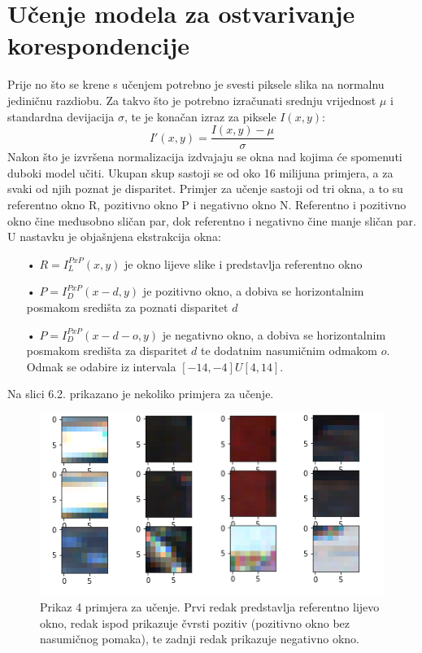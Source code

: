 \documentclass[times, utf8, zavrsni, numeric]{fer}
\begin{document}
\section{Učenje modela za ostvarivanje korespondencije}
Prije no što se krene s učenjem potrebno je svesti piksele slika na normalnu jediničnu razdiobu. Za takvo što je potrebno izračunati srednju vrijednost $\mu$ i standardna devijacija $\sigma$, te je konačan izraz za piksele $I(x,y)$:
\begin{equation}
I'(x,y)= \frac{I(x,y) - \mu}{\sigma}
\label{eq:normalizacija}
\end{equation}
Nakon što je izvršena normalizacija izdvajaju se okna nad kojima će spomenuti duboki model učiti.
Ukupan skup sastoji se od oko 16 milijuna primjera, a za svaki od njih poznat je disparitet.
Primjer za učenje sastoji od tri okna, a to su referentno okno R, pozitivno okno P i negativno okno N. Referentno i pozitivno okno čine međusobno sličan par, dok referentno i negativno čine manje sličan par. U nastavku je objašnjena ekstrakcija okna:
\begin{itemize}
\item[•] $R = I_{L}^{PxP}(x,y)$ je okno lijeve slike i predstavlja referentno okno
\item[•] $P = I_{D}^{PxP}(x-d,y)$ je pozitivno okno, a dobiva se horizontalnim posmakom središta za poznati disparitet $d$
\item[•] $P = I_{D}^{PxP}(x-d-o,y)$ je negativno okno, a dobiva se horizontalnim posmakom središta  za disparitet $d$ te dodatnim nasumičnim odmakom $o$. Odmak se odabire iz intervala $[-14, -4] U [4, 14]$.
\end{itemize}
Na slici 6.2. prikazano je nekoliko primjera za učenje.

\begin{figure}[htb]
\centering
\includegraphics[scale = 0.7]{img/okna.png}
\caption{Prikaz 4 primjera za učenje. Prvi redak predstavlja referentno lijevo okno, redak ispod prikazuje čvrsti pozitiv (pozitivno okno bez nasumičnog pomaka), te zadnji redak prikazuje negativno okno.}
\label{fig:KITTI}
\end{figure}
\end{document}
